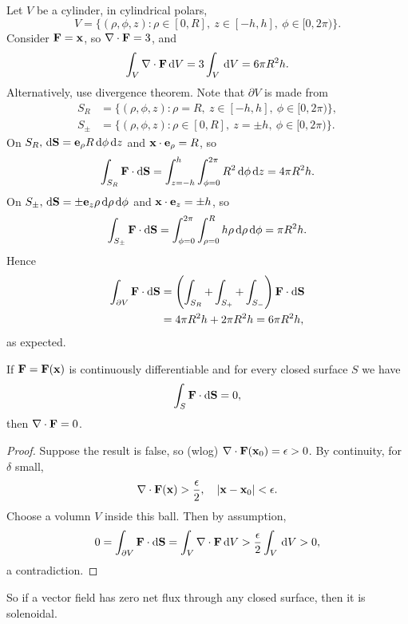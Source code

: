 \begin{example}
    Let $V$ be a cylinder, in cylindrical polars, 
    \[
        V = \{(\rho,\phi,z): \rho\in [0,R],\ z\in [-h,h],\ \phi\in [0,2\pi)\}.
    \]
    Consider $ {\bf F} = {\bf x} $, so $ \nabla\cdot{\bf F} = 3 $, and 
    \[
        \int_{V} \nabla\cdot{\bf F} \,\mathrm{d}V = 3 \int_{V} \,\mathrm{d}V = 6 \pi R^2 h.
    \]
    Alternatively, use divergence theorem. Note that $ \partial V $ is made from 
    \begin{align*}
        S_R &= \{(\rho,\phi,z): \rho=R,\ z\in [-h,h],\ \phi\in [0,2\pi)\},\\ 
        S_{\pm} &= \{(\rho,\phi,z): \rho\in [0,R],\ z=\pm h,\ \phi\in [0,2\pi)\}.
    \end{align*}
    On $ S_R, \,\mathrm{d} {\bf S} = \mathbf{e}_\rho R \,\mathrm{d} \phi\,\mathrm{d} z $ and $ {\bf x} \cdot \mathbf{e}_\rho=R $, so
    \[
        \int_{S_R} {\bf F} \cdot\mathrm{d}\mathbf{S} = \int_{z=-h}^{h} \int_{\phi=0}^{2\pi} R^2 \,\mathrm{d}\phi \,\mathrm{d}z = 4\pi R^2 h.
    \]
    On $ S_{\pm}, \,\mathrm{d} {\bf S} = \pm {\bf e}_z \rho\,\mathrm{d} \rho\,\mathrm{d} \phi $ and $ {\bf x} \cdot {\bf e}_z = \pm h $, so 
    \[
        \int_{S_\pm} {\bf F} \cdot\mathrm{d}\mathbf{S} = \int_{\phi=0}^{2\pi} \int_{\rho=0}^{R} h\rho \,\mathrm{d}\rho \,\mathrm{d}\phi = \pi R^2 h.
    \]
    Hence 
    \begin{align*}
        \int_{\partial V} {\bf F} \cdot\mathrm{d}\mathbf{S} &= \left( \int_{S_R}+\int_{S_+}+\int_{S_-} \right) {\bf F}\cdot\mathrm{d}{\bf S}\\ 
        &= 4\pi R^2 h+ 2 \pi R^2 h = 6\pi R^2 h,
    \end{align*}
    as expected.
\end{example}

\begin{proposition}
    If $ {\bf F} = {\bf F}({\bf x}) $ is continuously differentiable and for every closed surface $S$ we have 
    \[
        \int_{S}  {\bf F}\cdot \mathrm{d}{\bf S} = 0,
    \]
    then $ \nabla\cdot{\bf F}= 0 $.
\end{proposition}
\begin{proof}
    Suppose the result is false, so (wlog) $ \nabla\cdot{\bf F}({\bf x}_0)=\epsilon>0 $. By continuity, for $ \delta $ small, 
    \[
        \nabla\cdot{\bf F}({\bf x})>\frac{\epsilon}{2}, \quad |{\bf x}-{\bf x}_0|<\epsilon.
    \]
    Choose a volumn $V$ inside this ball. Then by assumption,
    \[
        0 = \int_{\partial V} {\bf F} \cdot\mathrm{d}\mathbf{S} = \int_{V} \nabla\cdot{\bf F} \,\mathrm{d}V > \frac{\epsilon}{2} \int_{V} \,\mathrm{d}V>0,
    \]
    a contradiction.
\end{proof}
So if a vector field has zero net flux through any closed surface, then it is solenoidal.


